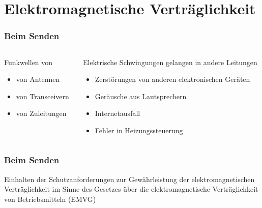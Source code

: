 
\section{Elektromagnetische Verträglichkeit}
\label{section:elektromagnetische_vertraeglichkeit}
\begin{frame}%

\frametitle{Beim Senden}
    \pause
    
\begin{columns}
    \begin{column}{0.48\textwidth}
    Funkwellen von

\begin{itemize}
  \item von Antennen
  \item von Transceivern
  \item von Zuleitungen
  \end{itemize}

    \end{column}
    \pause
    
   \begin{column}{0.48\textwidth}
       Elektrische Schwingungen gelangen in andere Leitungen

\begin{itemize}
  \item Zerstörungen von anderen elektronischen Geräten
  \item Geräusche aus Lautsprechern
  \item Internetausfall
  \item Fehler in Heizungssteuerung
  \end{itemize}

   \end{column}
\end{columns}



\end{frame}

\begin{frame}
\frametitle{Beim Senden}
Einhalten der Schutzanforderungen zur Gewährleistung der elektromagnetischen Verträglichkeit im Sinne des Gesetzes über die elektromagnetische Verträglichkeit von Betriebsmitteln (EMVG)

\end{frame}

